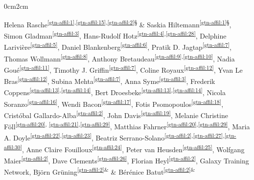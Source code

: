 \setcounter{NAT@ctr}{-1}
\cleartorightpage
\chapter*{}\label{chapter:gtn}


\begin{changemargin}{0cm}{2cm}
\end{changemargin}

Helena Rasche\textsuperscript{\ref{gtn-affil:1},\ref{gtn-affil:15},\ref{gtn-affil:2}§} \&
Saskia Hiltemann\textsuperscript{\ref{gtn-affil:1}§},
Simon Gladman\textsuperscript{\ref{gtn-affil:3}\dag},
Hans-Rudolf Hotz\textsuperscript{\ref{gtn-affil:4},\ref{gtn-affil:28}},
Delphine Larivière\textsuperscript{\ref{gtn-affil:5}},
Daniel Blankenberg\textsuperscript{\ref{gtn-affil:6}},
Pratik D. Jagtap\textsuperscript{\ref{gtn-affil:7}},
Thomas Wollmann\textsuperscript{\ref{gtn-affil:8}},
Anthony Bretaudeau\textsuperscript{\ref{gtn-affil:9},\ref{gtn-affil:10}},
Nadia Goué\textsuperscript{\ref{gtn-affil:11}},
Timothy J. Griffin\textsuperscript{\ref{gtn-affil:7}},
Coline Royaux\textsuperscript{\ref{gtn-affil:12}},
Yvan Le Bras\textsuperscript{\ref{gtn-affil:12}},
Subina Mehta\textsuperscript{\ref{gtn-affil:7}},
Anna Syme\textsuperscript{\ref{gtn-affil:3}},
Frederik Coppens\textsuperscript{\ref{gtn-affil:13},\ref{gtn-affil:14}},
Bert Droesbeke\textsuperscript{\ref{gtn-affil:13},\ref{gtn-affil:14}},
Nicola Soranzo\textsuperscript{\ref{gtn-affil:16}},
Wendi Bacon\textsuperscript{\ref{gtn-affil:17}},
Fotis Psomopoulos\textsuperscript{\ref{gtn-affil:18}},
Cristóbal Gallardo-Alba\textsuperscript{\ref{gtn-affil:2}},
John Davis\textsuperscript{\ref{gtn-affil:19}}, 
Melanie Christine Föll\textsuperscript{\ref{gtn-affil:20}, \ref{gtn-affil:21},\ref{gtn-affil:29}},
Matthias Fahrner\textsuperscript{\ref{gtn-affil:20},\ref{gtn-affil:29}},
Maria A. Doyle\textsuperscript{\ref{gtn-affil:22},\ref{gtn-affil:23}},
Beatriz Serrano-Solano\textsuperscript{\ref{gtn-affil:2},\ref{gtn-affil:27},\ref{gtn-affil:30}},
Anne Claire Fouilloux\textsuperscript{\ref{gtn-affil:24}},
Peter van Heusden\textsuperscript{\ref{gtn-affil:25}},
Wolfgang Maier\textsuperscript{\ref{gtn-affil:2}},
Dave Clements\textsuperscript{\ref{gtn-affil:26}},
Florian Heyl\textsuperscript{\ref{gtn-affil:2}},
Galaxy Training Network\textsuperscript{\textpilcrow},
Björn Grüning\textsuperscript{\ref{gtn-affil:2}\&} \&
Bérénice Batut\textsuperscript{\ref{gtn-affil:2}\&}

